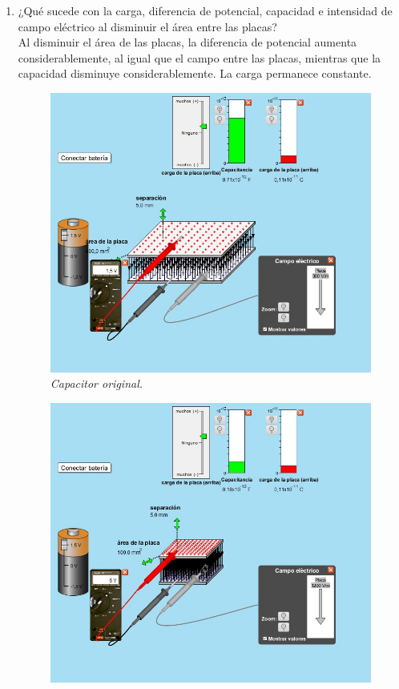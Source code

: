 \documentclass[12pt]{report}
\begin{document}
\begin{enumerate}
\begin{enumerate}
        
  \item ¿Qué sucede con la carga, diferencia de potencial, capacidad e intensidad de campo eléctrico al disminuir el área entre las placas?\\[6pt]
            Al disminuir el área de las placas, la diferencia de potencial aumenta considerablemente, al igual que el campo entre las placas, mientras que la capacidad disminuye considerablemente. La carga permanece constante.\\

      \begin{figure}[h]
          \centering
          \begin{minipage}[h]{0.4\textwidth}
          \centering
          \includegraphics[width=1\textwidth]{./images/3foto4.jpg} 
          \textit{Capacitor original.} 
          \end{minipage}\hskip 1cm
          \begin{minipage}[h]{0.4\textwidth}
          \centering
          \includegraphics[width=1\textwidth]{./images/3foto6.jpg} 

\end{minipage}
\end{figure}
\end{enumerate}
\end{enumerate}
\end{document}
